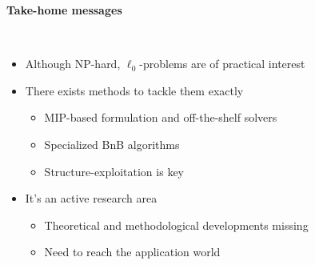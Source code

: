 \begin{frame}
    \begin{center}
        \Large{\textbf{Take-home messages}}
    \end{center}
    ~\\
    \begin{itemize}[label=\textbullet]
        \item Although \textcolor{TolLightOrange}{NP-hard}, $\ell_0$-problems are of \textcolor{TolLightOrange}{practical interest}
        \item There exists methods to tackle them exactly
        \begin{itemize}[label=\textbullet]
        \item \textcolor{TolLightOrange}{MIP-based} formulation and off-the-shelf solvers
        \item Specialized \textcolor{TolLightOrange}{BnB} algorithms
        \item \textcolor{TolLightOrange}{Structure-exploitation} is key
        \end{itemize}
        \item It's an active research area
        \begin{itemize}[label=\textbullet]
        \item Theoretical and methodological developments missing
        \item Need to reach the application world
        \end{itemize}
    \end{itemize}
\end{frame}